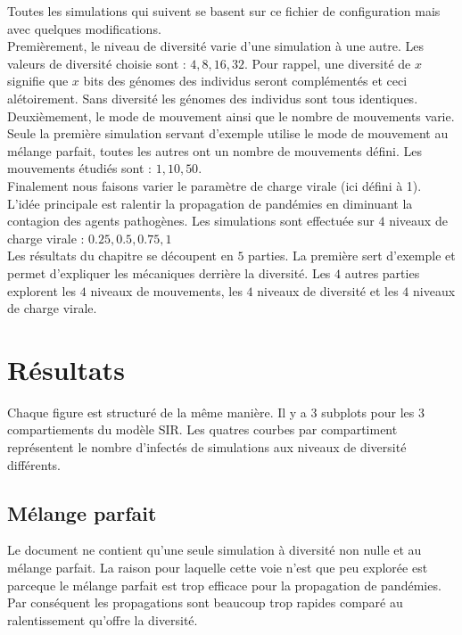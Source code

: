 Toutes les simulations qui suivent se basent sur ce fichier de configuration mais avec quelques modifications.\\

Premièrement, le niveau de diversité varie d'une simulation à une autre. Les valeurs de diversité choisie sont : $4,8,16,32$. Pour rappel, une diversité de $x$ signifie que $x$ bits des génomes des individus seront complémentés et ceci alétoirement. Sans diversité les génomes des individus sont tous identiques.\\

Deuxièmement, le mode de mouvement ainsi que le nombre de mouvements varie. Seule la première simulation servant d'exemple utilise le mode de mouvement au mélange parfait, toutes les autres ont un nombre de mouvements défini. Les mouvements étudiés sont : $1,10,50$.\\

Finalement nous faisons varier le paramètre de charge virale (ici défini à 1). L'idée principale est ralentir la propagation de pandémies en diminuant la contagion des agents pathogènes. Les simulations sont effectuée sur $4$ niveaux de charge virale : $0.25,0.5,0.75,1$\\

Les résultats du chapitre se découpent en $5$ parties. La première sert d'exemple et permet d'expliquer les mécaniques derrière la diversité. Les $4$ autres parties explorent les $4$ niveaux de mouvements, les $4$ niveaux de diversité et les $4$ niveaux de charge virale.

\section{Résultats}

Chaque figure est structuré de la même manière. Il y a 3 subplots pour les 3 compartiements du modèle SIR. Les quatres courbes par compartiment représentent le nombre d'infectés de simulations aux niveaux de diversité différents.

\subsection{Mélange parfait}

Le document ne contient qu'une seule simulation à diversité non nulle et au mélange parfait. La raison pour laquelle cette voie n'est que peu explorée est parceque le mélange parfait est trop efficace pour la propagation de pandémies. Par conséquent les propagations sont beaucoup trop rapides comparé au ralentissement qu'offre la diversité.

